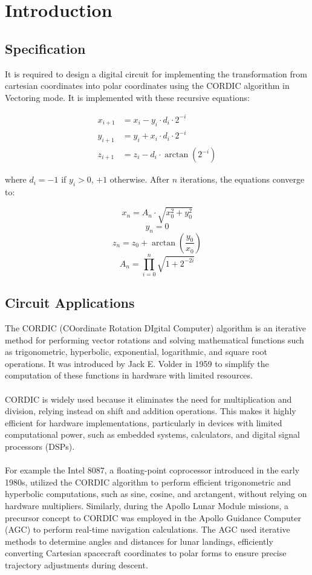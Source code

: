 \chapter{Introduction}

\section{Specification}

It is required to design a digital circuit for implementing the transformation from cartesian coordinates into polar coordinates using the CORDIC algorithm in Vectoring mode. It is implemented
with these recursive equations:

\begin{align*}
    x_{i+1} & = x_i - y_i \cdot d_i \cdot 2^{-i} \\
    y_{i+1} & = y_i + x_i \cdot d_i \cdot 2^{-i} \\
    z_{i+1} & = z_i - d_i \cdot \arctan(2^{-i})
\end{align*}

where \(d_i = -1\) if \(y_i > 0\), \(+1\) otherwise. After \(n\) iterations, the equations converge to:

\[
    x_n = A_n \cdot \sqrt{x_0^2 + y_0^2}
\]
\[
    y_n = 0
\]
\[
    z_n = z_0 + \arctan\left(\frac{y_0}{x_0}\right)
\]
\[
    A_n = \prod_{i=0}^n \sqrt{1 + 2^{-2i}}
\]


\section{Circuit Applications}
The CORDIC (COordinate Rotation DIgital Computer) algorithm is an iterative method for performing vector rotations and 
solving mathematical functions such as trigonometric, hyperbolic, exponential, logarithmic, and square root operations. 
It was introduced by Jack E. Volder in 1959 to simplify the computation of these functions in hardware with limited resources.
\\\\
CORDIC is widely used because it eliminates the need for multiplication and division, relying instead on shift and addition operations. 
This makes it highly efficient for hardware implementations, particularly in devices with limited computational power, 
such as embedded systems, calculators, and digital signal processors (DSPs).
\\\\
For example the Intel 8087, a floating-point coprocessor introduced in the early 1980s, utilized the CORDIC algorithm to perform 
efficient trigonometric and hyperbolic computations, such as sine, cosine, and arctangent, without relying on hardware multipliers.
Similarly, during the Apollo Lunar Module missions, a precursor concept to CORDIC was employed in the Apollo Guidance Computer (AGC) 
to perform real-time navigation calculations. The AGC used iterative methods to determine angles and distances for lunar landings, 
efficiently converting Cartesian spacecraft coordinates to polar forms to ensure precise trajectory adjustments during descent.

